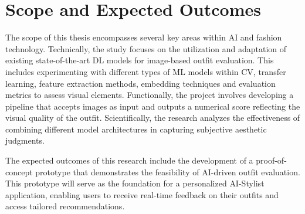 \section{Scope and Expected Outcomes}

The scope of this thesis encompasses several key areas within \acs{AI} and fashion technology. Technically, the study focuses on the utilization and adaptation of existing state-of-the-art \acs{DL} models for image-based outfit evaluation. This includes experimenting with different types of \acs{ML} models within \ac{CV}, transfer learning, feature extraction methods, embedding techniques and evaluation metrics to assess visual elements. Functionally, the project involves developing a pipeline that accepts images as input and outputs a numerical score reflecting the visual quality of the outfit. Scientifically, the research analyzes the effectiveness of combining different model architectures in capturing subjective aesthetic judgments.

The expected outcomes of this research include the development of a proof-of-concept prototype that demonstrates the feasibility of \acs{AI}-driven outfit evaluation. This prototype will serve as the foundation for a personalized \acs{AI}-Stylist application, enabling users to receive real-time feedback on their outfits and access tailored recommendations.